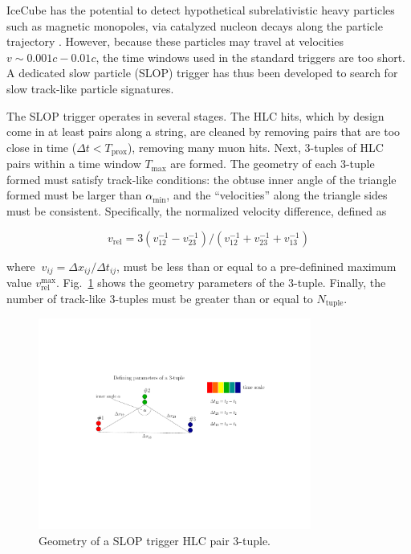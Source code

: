 IceCube has the potential to detect hypothetical subrelativistic heavy
particles such as magnetic monopoles, via catalyzed nucleon decays along
the particle trajectory \cite{IC3:monopole}.  However, because these
particles may travel at velocities $v \sim 0.001c - 0.01c$, the
time windows used in the standard triggers are too short.  A
dedicated slow particle (SLOP) trigger has thus been developed to 
search for slow track-like particle signatures.

The SLOP trigger operates in several stages.  The HLC hits, which by
design come in at least pairs along a string, are cleaned by removing pairs
that are too close in time ($\Delta t < T_{\mathrm{prox}}$), removing
many muon hits.  Next, 3-tuples of HLC pairs within a time window
$T_{\mathrm{max}}$ are formed.  The geometry of each
3-tuple formed must satisfy track-like conditions: the obtuse inner angle
of the triangle formed must be larger than $\alpha_{\mathrm{min}}$, and the
``velocities'' along the triangle sides must be consistent.  Specifically,
the normalized velocity difference, defined as

\begin{equation}
  v_{\mathrm{rel}} =
  3(v^{-1}_{12} - v^{-1}_{23})/(v^{-1}_{12} + v^{-1}_{23} +
  v^{-1}_{13})
\end{equation}

\noindent where $\ v_{ij} = \Delta x_{ij}/\Delta t_{ij}$, must be less than
or equal to a pre-definined maximum value
$v_{\mathrm{rel}}^{\mathrm{max}}$.  Fig.~\ref{fig:slop} 
shows the geometry parameters of the 3-tuple.  Finally, the number of track-like
3-tuples must be greater than or equal to $N_{\mathrm{tuple}}$.  

\begin{figure}[!h]
 \centering
 \includegraphics[width=0.8\textwidth]{graphics/online/trigger/slop.pdf}
 \caption{Geometry of a SLOP trigger HLC pair 3-tuple.}
 \label{fig:slop}
\end{figure}

